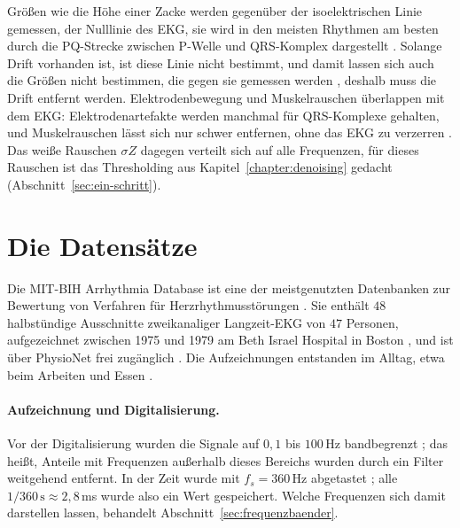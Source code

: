 \documentclass[a4paper,11pt,bibliography=totoc,listof=totoc,headinclude=true,cleardoublepage=empty,oneside]{scrbook}
\theoremstyle{plain}
\theoremstyle{definition}
\begin{document}
Grö\ss en wie die Höhe einer Zacke werden gegenüber der isoelektrischen Linie
gemessen, der Nulllinie des EKG, sie wird in den meisten Rhythmen am besten
durch die PQ-Strecke zwischen P-Welle und QRS-Komplex dargestellt
\cite[Kap.~7.1.3]{sornmo}. %
Solange Drift vorhanden ist, ist diese Linie nicht bestimmt, und damit lassen
sich auch die Grö\ss en nicht bestimmen, die gegen sie gemessen werden
\cite[Kap.~6.5]{sornmo}, %
deshalb muss die Drift entfernt werden.
Elektrodenbewegung und Muskelrauschen überlappen mit dem EKG:
Elektrodenartefakte werden manchmal für QRS-Komplexe gehalten, und
Muskelrauschen lässt sich nur schwer entfernen, ohne das EKG zu verzerren
\cite[Kap.~6.5]{sornmo}. %
Das wei\ss e Rauschen $\sigma Z$ dagegen verteilt sich auf alle Frequenzen,
für dieses Rauschen ist das Thresholding aus Kapitel~\ref{chapter:denoising}
gedacht (Abschnitt~\ref{sec:ein-schritt}).

\section{Die Datensätze}
\label{sec:daten}

Die MIT-BIH Arrhythmia Database ist eine der meistgenutzten Datenbanken zur
Bewertung von Verfahren für Herzrhythmusstörungen \cite[Kap.~1.4.1]{sornmo}. %
Sie enthält $48$ halbstündige Ausschnitte zweikanaliger
Langzeit-EKG von $47$ Personen, aufgezeichnet zwischen 1975 und 1979 am Beth
Israel Hospital in Boston \cite[Abschn.~Selection of Data]{mitbih}, %
und ist über PhysioNet frei zugänglich \cite{mitdbseite}. %
Die Aufzeichnungen entstanden im Alltag, etwa beim Arbeiten und Essen
\cite[Kap.~1.4.1]{sornmo}. %

\paragraph{Aufzeichnung und Digitalisierung.}
Vor der Digitalisierung wurden die Signale auf $0{,}1$ bis $100$\,Hz
bandbegrenzt \cite[Abschn.~Technical Limitations of the Data]{mitbih}; %
das hei\ss t, Anteile mit Frequenzen au\ss erhalb dieses Bereichs wurden durch
ein Filter weitgehend entfernt. In der Zeit wurde mit $f_s = 360$\,Hz abgetastet
\cite[Abschn.~Digitization]{mitbih}; %
alle $1/360\,\mathrm s \approx 2{,}8$\,ms wurde also ein Wert gespeichert.
Welche Frequenzen sich damit darstellen lassen, behandelt
Abschnitt~\ref{sec:frequenzbaender}.
\end{document}
